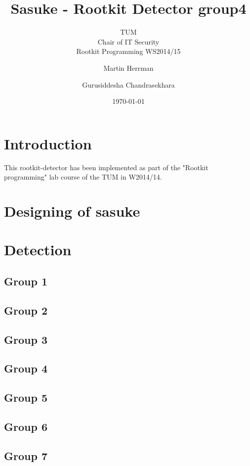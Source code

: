 \documentclass[10pt, letterpaper]{scrartcl}
\title{Sasuke - Rootkit Detector group4}
\subtitle{TUM \\Chair of IT Security\\  Rootkit Programming WS2014/15}
\author{Martin Herrman \and Gurusiddesha Chandrasekhara}
\date{\today}
\begin{document}
\maketitle
\tableofcontents
\newpage

\section{Introduction}
This rootkit-detector has been implemented as part of the "Rootkit programming" lab course of the TUM in W2014/14. 

\section{Designing of sasuke}

\section{Detection}

\subsection{Group 1}
\subsection{Group 2}
\subsection{Group 3}
\subsection{Group 4}
\subsection{Group 5}
\subsection{Group 6}
\subsection{Group 7}
\end{document}
